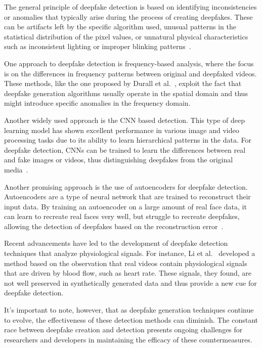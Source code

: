 The general principle of deepfake detection is based on identifying inconsistencies
or anomalies that typically arise during the process of creating deepfakes. These
can be artifacts left by the specific algorithm used, unusual patterns in the
statistical distribution of the pixel values, or unnatural physical characteristics
such as inconsistent lighting or improper blinking patterns~\cite{Agarwal_2019_CVPR_Workshops}.

One approach to deepfake detection is frequency-based analysis, where the focus is
on the differences in frequency patterns between original and deepfaked videos.
These methods, like the one proposed by Durall et al.~\cite{durall2020unmasking},
exploit the fact that deepfake generation algorithms usually operate in the
spatial domain and thus might introduce specific anomalies in the frequency domain.

Another widely used approach is the \ac{CNN} based detection. This type of deep
learning model has shown excellent performance in various image and video
processing tasks due to its ability to learn hierarchical patterns in the data.
For deepfake detection, \ac{CNN}s can be trained to learn the differences between
real and fake images or videos, thus distinguishing deepfakes from the original
media~\cite{nguyen2018capsuleforensics}.

Another promising approach is the use of autoencoders for deepfake detection.
Autoencoders are a type of neural network that are trained to reconstruct
their input data. By training an autoencoder on a large amount of real face
data, it can learn to recreate real faces very well, but struggle to recreate
deepfakes, allowing the detection of deepfakes based on the reconstruction
error~\cite{cozzolino2017recasting}.

Recent advancements have led to the development of deepfake detection techniques
that analyze physiological signals. For instance, Li et al.~\cite{li2018ictu}
developed a method based on the observation that real videos contain physiological
signals that are driven by blood flow, such as heart rate. These signals, they
found, are not well preserved in synthetically generated data and thus provide
a new cue for deepfake detection.

It's important to note, however, that as deepfake generation techniques
continue to evolve, the effectiveness of these detection methods can diminish.
The constant race between deepfake creation and detection presents ongoing
challenges for researchers and developers in maintaining the efficacy of these
countermeasures.